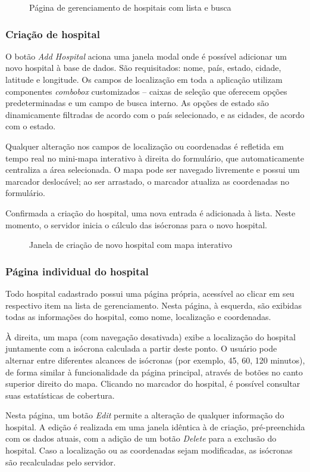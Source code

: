 \documentclass{article}
\newcommand{\image}[2]{
    \begin{figure}[H]
        \fcolorbox{light-gray}{white}{\texttt{[image: \#1]}}
        \caption{#2}
    \end{figure}
}
\begin{document}
\image{05.png}{Página de gerenciamento de hospitais com lista e busca}

\subsubsection{Criação de hospital}

O botão \textit{Add Hospital} aciona uma janela modal onde é possível adicionar um novo hospital à base de dados. São requisitados: nome, país, estado, cidade, latitude e longitude. Os campos de localização em toda a aplicação utilizam componentes \textit{combobox} customizados – caixas de seleção que oferecem opções predeterminadas e um campo de busca interno. As opções de estado são dinamicamente filtradas de acordo com o país selecionado, e as cidades, de acordo com o estado.

Qualquer alteração nos campos de localização ou coordenadas é refletida em tempo real no mini-mapa interativo à direita do formulário, que automaticamente centraliza a área selecionada. O mapa pode ser navegado livremente e possui um marcador deslocável; ao ser arrastado, o marcador atualiza as coordenadas no formulário.

Confirmada a criação do hospital, uma nova entrada é adicionada à lista. Neste momento, o servidor inicia o cálculo das isócronas para o novo hospital.

\image{06.png}{Janela de criação de novo hospital com mapa interativo}

\subsubsection{Página individual do hospital}

Todo hospital cadastrado possui uma página própria, acessível ao clicar em seu respectivo item na lista de gerenciamento. Nesta página, à esquerda, são exibidas todas as informações do hospital, como nome, localização e coordenadas.

À direita, um mapa (com navegação desativada) exibe a localização do hospital juntamente com a isócrona calculada a partir deste ponto. O usuário pode alternar entre diferentes alcances de isócronas (por exemplo, 45, 60, 120 minutos), de forma similar à funcionalidade da página principal, através de botões no canto superior direito do mapa. Clicando no marcador do hospital, é possível consultar suas estatísticas de cobertura.

Nesta página, um botão \textit{Edit} permite a alteração de qualquer informação do hospital. A edição é realizada em uma janela idêntica à de criação, pré-preenchida com os dados atuais, com a adição de um botão \textit{Delete} para a exclusão do hospital. Caso a localização ou as coordenadas sejam modificadas, as isócronas são recalculadas pelo servidor.
\end{document}
